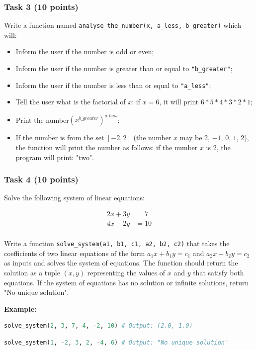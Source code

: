 \documentclass[12pt]{book}
\begin{document}
\subsubsection{Task 3 (10 points)}
Write a function named \texttt{analyse\_the\_number(x, a\_less, b\_greater)} which will:
\begin{itemize}
\item Inform the user if the number is odd or even;
\item Inform the user if the number is greater than or equal to \texttt{"b\_greater"};
\item Inform the user if the number is less than or equal to \texttt{"a\_less"};
\item Tell the user what is the factorial of $x$: if $x = 6$, it will print $6*5*4*3*2*1$;
\item Print the number$(x^{b\_greater})^{a\_less}$;
\item If the number is from the set $[-2, 2]$ (the number $x$ may be $2$, $-1$, $0$, $1$, $2$), the function will print the number as follows: if the number $x$ is $2$, the program will print: "two".
\end{itemize}

\subsubsection{Task 4 (10 points)}


Solve the following system of linear equations:

\[
\begin{align*}
2x + 3y &= 7 \\
4x - 2y &= 10 \\
\end{align*}
\]

Write a function \texttt{solve\_system(a1, b1, c1, a2, b2, c2)} that takes the coefficients of two linear equations of the form $a_1x + b_1y = c_1$ and $a_2x + b_2y = c_2$ as inputs and solves the system of equations. The function should return the solution as a tuple $(x, y)$ representing the values of $x$ and $y$ that satisfy both equations. If the system of equations has no solution or infinite solutions, return "No unique solution".

\textbf{Example:}
\begin{lstlisting}[language=Python]
solve_system(2, 3, 7, 4, -2, 10) # Output: (2.0, 1.0)
\end{lstlisting}

\begin{lstlisting}[language=Python]
solve_system(1, -2, 3, 2, -4, 6) # Output: "No unique solution"
\end{lstlisting}
\end{document}
